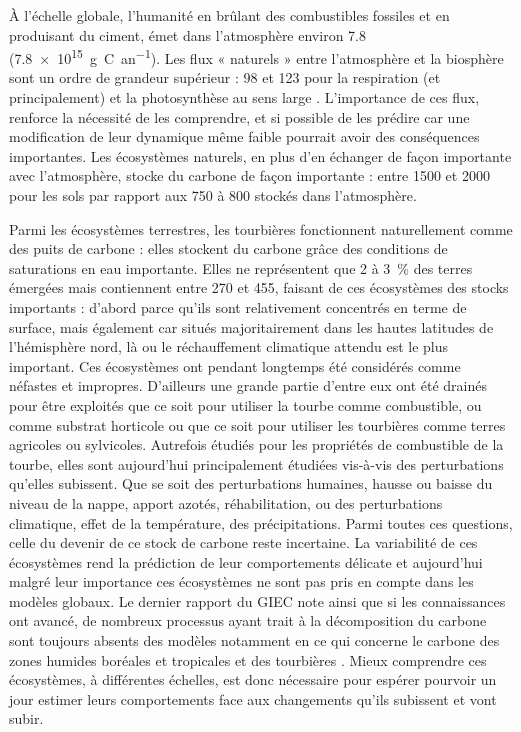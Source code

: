 À l'échelle globale, l'humanité en brûlant des combustibles fossiles et en produisant du ciment, émet dans l'atmosphère environ \SI{7.8}{\pgca} (\SI{7.8e15}{\gram C an^{-1}})\citep{Ciais2014}.
Les flux « naturels » entre l'atmosphère et la biosphère sont un ordre de grandeur supérieur : \num{98} et \SI{123}{\pgca} pour la respiration (\coo et \chh principalement) et la photosynthèse au sens large \citep{Bond-Lamberty2010,Beer2010}. L'importance de ces flux, renforce la nécessité de les comprendre, et si possible de les prédire car une modification de leur dynamique même faible pourrait avoir des conséquences importantes.
Les écosystèmes naturels, en plus d'en échanger de façon importante avec l'atmosphère, stocke du carbone de façon importante : entre \num{1500} et \SI{2000}{\pgc} pour les sols par rapport aux \num{750} à \SI{800}{\pgc} stockés dans l'atmosphère.

Parmi les écosystèmes terrestres, les tourbières fonctionnent naturellement comme des puits de carbone : elles stockent du carbone grâce des conditions de saturations en eau importante.
Elles ne représentent que \num{2} à \SI{3}{\percent} des terres émergées mais contiennent entre \num{270} et \SI{455}{\pgc}, faisant de ces écosystèmes des stocks importants \citep{gorham1991,turunen2002} :
d'abord parce qu'ils sont relativement concentrés en terme de surface, mais également car situés majoritairement dans les hautes latitudes de l'hémisphère nord, là ou le réchauffement climatique attendu est le plus important.
Ces écosystèmes ont pendant longtemps été considérés comme néfastes et impropres.
D'ailleurs une grande partie d'entre eux ont été drainés pour être exploités que ce soit pour utiliser la tourbe comme combustible, ou comme substrat horticole ou que ce soit pour utiliser les tourbières comme terres agricoles ou sylvicoles.
Autrefois étudiés pour les propriétés de combustible de la tourbe, elles sont aujourd'hui principalement étudiées vis-à-vis des perturbations qu'elles subissent.
Que se soit des perturbations humaines, hausse ou baisse du niveau de la nappe, apport azotés, réhabilitation, ou des perturbations climatique, effet de la température, des précipitations.
Parmi toutes ces questions, celle du devenir de ce stock de carbone reste incertaine.
La variabilité de ces écosystèmes rend la prédiction de leur comportements délicate et aujourd'hui malgré leur importance ces écosystèmes ne sont pas pris en compte dans les modèles globaux.
Le dernier rapport du GIEC note ainsi que si les connaissances ont avancé, de nombreux processus ayant trait à la décomposition du carbone sont toujours absents des modèles notamment en ce qui concerne le carbone des zones humides boréales et tropicales et des tourbières \citep{Ciais2014}.
Mieux comprendre ces écosystèmes, à différentes échelles, est donc nécessaire pour espérer pourvoir un jour estimer leurs comportements face aux changements qu'ils subissent et vont subir.


